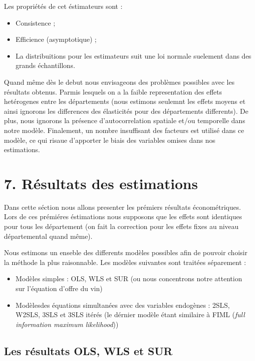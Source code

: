 \documentclass[11pt,]{article}
\providecommand{\tightlist}{%
  \setlength{\itemsep}{0pt}\setlength{\parskip}{0pt}}
\begin{document}
Les propriétés de cet éstimateurs sont :

\begin{itemize}
\tightlist
\item
  Consistence ;
\item
  Efficience (asymptotique) ;
\item
  La distribuitions pour les estimateurs suit une loi normale suelement
  dans des grands échantillons.
\end{itemize}

Quand même dès le debut nous envisageons des problèmes possibles avec
les résultats obtenus. Parmis lesquels on a la faible representation des
effets hetérogenes entre les départements (nous estimons seulemnt les
effets moyens et ainsi ignorons les differences des élasticités pour des
départements differents). De plus, nous ignorons la présence
d'autocorrelation spatiale et/ou temporelle dans notre modèle.
Finalement, un nombre insuffisant des facteurs est utilisé dans ce
modèle, ce qui risaue d'apporter le biais des variables omises dans nos
estimations.

\hypertarget{resultats-des-estimations}{%
\section{7. Résultats des estimations}\label{resultats-des-estimations}}

Dans cette séction nous allons presenter les prémiers résultats
économétriques. Lors de ces prémiéres éstimations nous supposons que les
effets sont identiques pour tous les département (on fait la correction
pour les effets fixes au niveau départemental quand même).

Nous estimons un enseble des differents modèles possibles afin de
pouvoir choisir la méthode la plus raisonnable. Les modèles suivantes
sont traitées séparement :

\begin{itemize}
\tightlist
\item
  Modèles simples : OLS, WLS et SUR (ou nous concentrons notre attention
  sur l'équation d'offre du vin)
\item
  Modèlesdes équations simultanées avec des variables endogènes : 2SLS,
  W2SLS, 3SLS et 3SLS itérés (le dérnier modèle étant similaire à FIML
  (\emph{full information maximum likelihood}))
\end{itemize}

\hypertarget{les-resultats-ols-wls-et-sur}{%
\subsection{Les résultats OLS, WLS et
SUR}\label{les-resultats-ols-wls-et-sur}}
\end{document}
